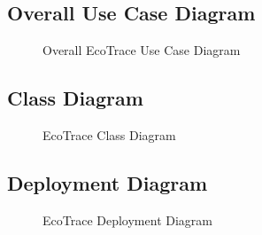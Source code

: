 \subsection{Overall Use Case Diagram}

\begin{figure}[H]
\centering


\caption{Overall EcoTrace Use Case Diagram}

\label{fig:overall_usecase}

\end{figure}

\subsection{Class Diagram}

\begin{figure}[H]
\centering


\caption{EcoTrace Class Diagram}

\label{fig:classdiagram}

\end{figure}

\subsection{Deployment Diagram}

\begin{figure}[H]
\centering


\caption{EcoTrace Deployment Diagram}

\label{fig:deployment}

\end{figure}

